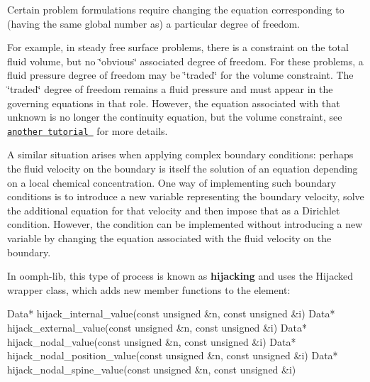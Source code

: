 Certain problem formulations require changing the equation corresponding to (having the same global number as) a particular degree of freedom.

For example, in steady free surface problems, there is a constraint on the total fluid volume, but no \char`\"{}obvious\char`\"{} associated degree of freedom. For these problems, a fluid pressure degree of freedom may be \char`\"{}traded\char`\"{} for the volume constraint. The \char`\"{}traded\char`\"{} degree of freedom remains a fluid pressure and must appear in the governing equations in that role. However, the equation associated with that unknown is no longer the continuity equation, but the volume constraint, see \href{../../navier_stokes/static_single_layer/html/index.html}{\tt another tutorial } for more details.

A similar situation arises when applying complex boundary conditions\+: perhaps the fluid velocity on the boundary is itself the solution of an equation depending on a local chemical concentration. One way of implementing such boundary conditions is to introduce a new variable representing the boundary velocity, solve the additional equation for that velocity and then impose that as a Dirichlet condition. However, the condition can be implemented without introducing a new variable by changing the equation associated with the fluid velocity on the boundary.

In {\ttfamily oomph-\/lib}, this type of process is known as {\bfseries hijacking} and uses the {\ttfamily Hijacked} wrapper class, which adds new member functions to the element\+: 
\begin{DoxyCode}
Data* hijack\_internal\_value(\textcolor{keyword}{const} \textcolor{keywordtype}{unsigned} &n, \textcolor{keyword}{const} \textcolor{keywordtype}{unsigned} &i)
Data* hijack\_external\_value(\textcolor{keyword}{const} \textcolor{keywordtype}{unsigned} &n, \textcolor{keyword}{const} \textcolor{keywordtype}{unsigned} &i)
Data* hijack\_nodal\_value(\textcolor{keyword}{const} \textcolor{keywordtype}{unsigned} &n, \textcolor{keyword}{const} \textcolor{keywordtype}{unsigned} &i)
Data* hijack\_nodal\_position\_value(\textcolor{keyword}{const} \textcolor{keywordtype}{unsigned} &n, \textcolor{keyword}{const} \textcolor{keywordtype}{unsigned} &i)
Data* hijack\_nodal\_spine\_value(\textcolor{keyword}{const} \textcolor{keywordtype}{unsigned} &n, \textcolor{keyword}{const} \textcolor{keywordtype}{unsigned} &i)
\end{DoxyCode}


